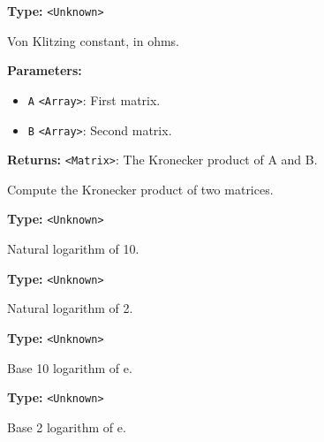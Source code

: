 \documentclass[12pt,a4paper]{article}
\begin{document}
\noindent \textbf{Type:} \texttt{<Unknown>}

\noindent Von Klitzing constant, in ohms.

\vspace{5mm}
\noindent {}


\noindent \textbf{Parameters:}
\begin{itemize}
  \item \texttt{A} \texttt{<Array>}: First matrix.
  \item \texttt{B} \texttt{<Array>}: Second matrix.
\end{itemize}

\noindent \textbf{Returns:} \texttt{<Matrix>}: The Kronecker product of A and B.

\noindent Compute the Kronecker product of two matrices.

\vspace{5mm}
\noindent {}\vspace{4mm}


\noindent \textbf{Type:} \texttt{<Unknown>}

\noindent Natural logarithm of 10.

\vspace{5mm}
\noindent {}\vspace{4mm}


\noindent \textbf{Type:} \texttt{<Unknown>}

\noindent Natural logarithm of 2.

\vspace{5mm}
\noindent {}\vspace{4mm}


\noindent \textbf{Type:} \texttt{<Unknown>}

\noindent Base 10 logarithm of e.

\vspace{5mm}
\noindent {}\vspace{4mm}


\noindent \textbf{Type:} \texttt{<Unknown>}

\noindent Base 2 logarithm of e.
\end{document}

